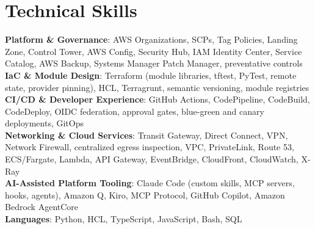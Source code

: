 \section{\textbf{Technical Skills}}
\vspace{-2pt}
\begin{itemize}[leftmargin=0.05in, label={}]
    \small{\item{
     \textbf{Platform \& Governance}{: AWS Organizations, SCPs, Tag Policies, Landing Zone, Control Tower, AWS Config, Security Hub, IAM Identity Center, Service Catalog, AWS Backup, Systems Manager Patch Manager, preventative controls} \\
     \textbf{IaC \& Module Design}{: Terraform (module libraries, tftest, PyTest, remote state, provider pinning), HCL, Terragrunt, semantic versioning, module registries} \\
     \textbf{CI/CD \& Developer Experience}{: GitHub Actions, CodePipeline, CodeBuild, CodeDeploy, OIDC federation, approval gates, blue-green and canary deployments, GitOps} \\
     \textbf{Networking \& Cloud Services}{: Transit Gateway, Direct Connect, VPN, Network Firewall, centralized egress inspection, VPC, PrivateLink, Route 53, ECS/Fargate, Lambda, API Gateway, EventBridge, CloudFront, CloudWatch, X-Ray} \\
     \textbf{AI-Assisted Platform Tooling}{: Claude Code (custom skills, MCP servers, hooks, agents), Amazon Q, Kiro, MCP Protocol, GitHub Copilot, Amazon Bedrock AgentCore} \\
     \textbf{Languages}{: Python, HCL, TypeScript, JavaScript, Bash, SQL}
    }}
\end{itemize}
\vspace{-2mm}
